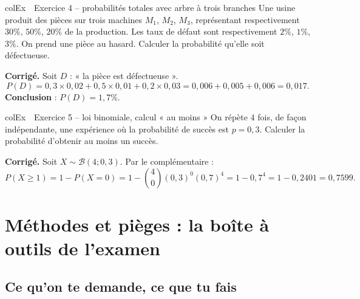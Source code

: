 \documentclass[11pt,a4paper]{article}
\newenvironment{exemple}[1][Exemple]
  {\begin{fiche}{colEx}{\ding{217}~~#1}}{\end{fiche}}
\begin{document}
\begin{exemple}[Exercice 4 -- probabilités totales avec arbre à trois branches]
Une usine produit des pièces sur trois machines $M_1$, $M_2$, $M_3$, représentant respectivement $30\%$, $50\%$, $20\%$ de la production. Les taux de défaut sont respectivement $2\%$, $1\%$, $3\%$. On prend une pièce au hasard. Calculer la probabilité qu'elle soit défectueuse.

\smallskip
\textbf{Corrigé.} Soit $D$ : « la pièce est défectueuse ».
\[
  P(D) = 0{,}3\times0{,}02+0{,}5\times0{,}01+0{,}2\times0{,}03 = 0{,}006+0{,}005+0{,}006 = 0{,}017.
\]
\textbf{Conclusion} : $P(D)=1{,}7\%$.
\end{exemple}

\begin{exemple}[Exercice 5 -- loi binomiale, calcul « au moins »]
On répète $4$ fois, de façon indépendante, une expérience où la probabilité de succès est $p=0{,}3$. Calculer la probabilité d'obtenir au moins un succès.

\smallskip
\textbf{Corrigé.} Soit $X\sim\mathcal{B}(4;0{,}3)$. Par le complémentaire :
\[
  P(X\geq1) = 1-P(X=0) = 1-\binom40(0{,}3)^0(0{,}7)^4 = 1-0{,}7^4 = 1-0{,}2401 = 0{,}7599.
\]
\end{exemple}

\section{Méthodes et pièges : la boîte à outils de l'examen}

\subsection{Ce qu'on te demande, ce que tu fais}
\end{document}
